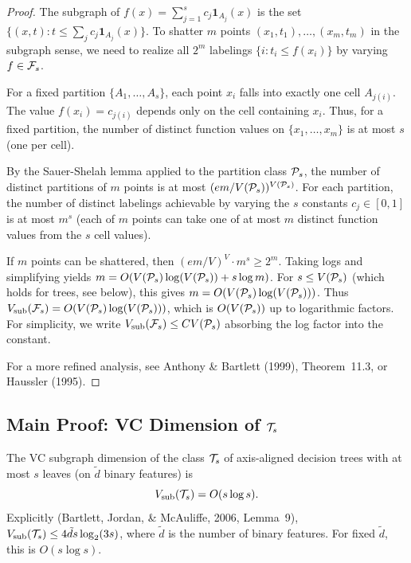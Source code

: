 \documentclass[12pt]{article}
\begin{document}
\begin{proof}
The subgraph of $f(x) = \sum_{j=1}^s c_j \mathbf{1}_{A_j}(x)$ is the set $\{(x,t) : t \le \sum_j c_j \mathbf{1}_{A_j}(x)\}$. To shatter $m$ points $(x_1, t_1), \ldots, (x_m, t_m)$ in the subgraph sense, we need to realize all $2^m$ labelings $\{i : t_i \le f(x_i)\}$ by varying $f \in \mathcal{F}_s$.

For a fixed partition $\{A_1, \ldots, A_s\}$, each point $x_i$ falls into exactly one cell $A_{j(i)}$. The value $f(x_i) = c_{j(i)}$ depends only on the cell containing $x_i$. Thus, for a fixed partition, the number of distinct function values on $\{x_1, \ldots, x_m\}$ is at most $s$ (one per cell).

By the Sauer-Shelah lemma applied to the partition class $\mathcal{P}_s$, the number of distinct partitions of $m$ points is at most $(em/V(\mathcal{P}_s))^{V(\mathcal{P}_s)}$. For each partition, the number of distinct labelings achievable by varying the $s$ constants $c_j \in [0,1]$ is at most $m^s$ (each of $m$ points can take one of at most $m$ distinct function values from the $s$ cell values).

If $m$ points can be shattered, then $(em/V)^V \cdot m^s \ge 2^m$. Taking logs and simplifying yields $m = O(V(\mathcal{P}_s) \log(V(\mathcal{P}_s)) + s \log m)$. For $s \le V(\mathcal{P}_s)$ (which holds for trees, see below), this gives $m = O(V(\mathcal{P}_s) \log(V(\mathcal{P}_s)))$. Thus $V_{\text{sub}}(\mathcal{F}_s) = O(V(\mathcal{P}_s) \log(V(\mathcal{P}_s)))$, which is $O(V(\mathcal{P}_s))$ up to logarithmic factors. For simplicity, we write $V_{\text{sub}}(\mathcal{F}_s) \le C V(\mathcal{P}_s)$ absorbing the log factor into the constant.

For a more refined analysis, see Anthony \& Bartlett (1999), Theorem~11.3, or Haussler (1995).
\end{proof}

\subsection{Main Proof: VC Dimension of $\mathcal{T}_s$}

\begin{theorem}
\label{thm:vc-trees-app}
The VC subgraph dimension of the class $\mathcal{T}_s$ of axis-aligned decision trees with at most $s$ leaves (on $\tilde{d}$ binary features) is
\[
V_{\text{sub}}(\mathcal{T}_s) = O(s \log s).
\]
Explicitly (Bartlett, Jordan, \& McAuliffe, 2006, Lemma~9), $V_{\text{sub}}(\mathcal{T}_s) \le 4\tilde{d}s \log_2(3s)$, where $\tilde{d}$ is the number of binary features. For fixed $\tilde{d}$, this is $O(s \log s)$.
\end{theorem}
\end{document}
